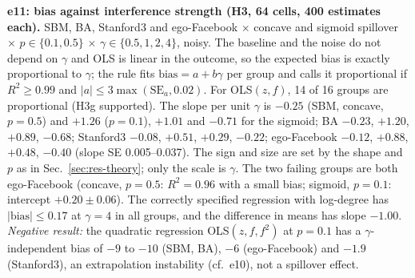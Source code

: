 \textbf{e11: bias against interference strength (H3, 64 cells, 400 estimates each).} SBM, BA, Stanford3 and ego-Facebook $\times$ concave and sigmoid spillover $\times$ $p\in\{0.1,0.5\}$ $\times$ $\gamma\in\{0.5,1,2,4\}$, noisy. The baseline and the noise do not depend on $\gamma$ and OLS is linear in the outcome, so the expected bias is exactly proportional to $\gamma$; the rule fits $\text{bias}=a+b\gamma$ per group and calls it proportional if $R^2\ge0.99$ and $|a|\le3\max(\mathrm{SE}_a,0.02)$. For OLS$(z,f)$, 14 of 16 groups are proportional (H3g supported). The slope per unit $\gamma$ is $-0.25$ (SBM, concave, $p=0.5$) and $+1.26$ ($p=0.1$), $+1.01$ and $-0.71$ for the sigmoid; BA $-0.23$, $+1.20$, $+0.89$, $-0.68$; Stanford3 $-0.08$, $+0.51$, $+0.29$, $-0.22$; ego-Facebook $-0.12$, $+0.88$, $+0.48$, $-0.40$ (slope SE 0.005--0.037). The sign and size are set by the shape and $p$ as in Sec.~\ref{sec:res-theory}; only the scale is $\gamma$. The two failing groups are both ego-Facebook (concave, $p=0.5$: $R^2=0.96$ with a small bias; sigmoid, $p=0.1$: intercept $+0.20\pm0.06$). The correctly specified regression with log-degree has $|\text{bias}|\le0.17$ at $\gamma=4$ in all groups, and the difference in means has slope $-1.00$. \emph{Negative result:} the quadratic regression OLS$(z,f,f^2)$ at $p=0.1$ has a $\gamma$-independent bias of $-9$ to $-10$ (SBM, BA), $-6$ (ego-Facebook) and $-1.9$ (Stanford3), an extrapolation instability (cf.\ e10), not a spillover effect.

